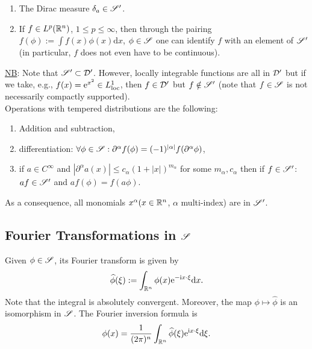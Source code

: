 \documentclass[11pt]{article}
\begin{document}
			\begin{eg}
				\begin{enumerate}
					\item The Dirac measure $\delta_a\in\mathscr{S}^\prime$.
					\item If $f\in L^p(\mathbb{R}^n)$, $1\le p\le\infty$, then through the pairing $f(\phi):=\int f(x)\phi(x)\mathrm{d}x$, $\phi\in\mathscr{S}$ one can identify  $f$ with an element of $\mathscr{S}^\prime$ (in particular, $f$ does not even have to be continuous).
				\end{enumerate}
			\end{eg}

			\noindent\underline{NB}: Note that $\mathscr{S}^\prime\subset\mathcal{D}^\prime$. However, locally integrable functions are all in $\mathcal{D}^\prime$ but if we take, e.g., $f(x)=\mathrm{e}^{x^2}\in L^1_\mathrm{loc}$, then $f\in\mathcal{D}^\prime$ but $f\notin\mathscr{S}^\prime$ (note that $f\in\mathscr{S}$ is not necessarily compactly supported).
			\\

			\noindent Operations with tempered distributions are the following:
			\begin{enumerate}
				\item Addition and subtraction,
				\item differentiation: $\forall\phi\in\mathscr{S}: \partial^{\alpha} f(\phi)=(-1)^{|\alpha|}f(\partial^\alpha\phi)$,
				\item if $a\in C^\infty$ and $|\partial^\alpha a(x)|\le c_\alpha (1+|x|)^{m_\alpha}$ for some $m_\alpha,c_\alpha$ then if $f\in\mathscr{S}^\prime$: $af\in\mathscr{S}^\prime$ and $af(\phi)=f(a\phi)$.
			\end{enumerate}
			\noindent As a consequence, all monomials $x^\alpha (x\in\mathbb{R}^n$, $\alpha$ multi-index) are in $\mathscr{S}^\prime$.


		\subsection{Fourier Transformations in $\mathscr{S}$}

			\begin{defi}
				Given $\phi\in\mathscr{S}$, its Fourier transform is given by
				\begin{equation*}
					\widehat{\phi}(\xi):=\int_{\mathbb{R}^n}\phi(x)\mathrm{e}^{-\mathrm{i} x\cdot\xi}\mathrm{d}x.
				\end{equation*}
				Note that the integral is absolutely convergent. Moreover, the map $\phi\mapsto\hat{\phi}$ is an isomorphism in $\mathscr{S}$. The Fourier inversion formula is
				\begin{equation*}
					\phi(x)=\frac{1}{(2\pi)^n}\int_{\mathbb{R}^n}\widehat{\phi}(\xi)\mathrm{e}^{\mathrm{i} x\cdot\xi}\mathrm{d}\xi.
				\end{equation*}
			\end{defi}
\end{document}
